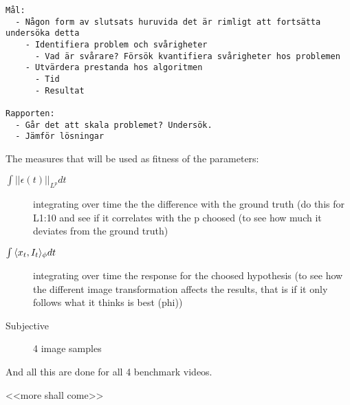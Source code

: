\begin{verbatim}
Mål:
  - Någon form av slutsats huruvida det är rimligt att fortsätta
undersöka detta
    - Identifiera problem och svårigheter
      - Vad är svårare? Försök kvantifiera svårigheter hos problemen
    - Utvärdera prestanda hos algoritmen
      - Tid
      - Resultat

Rapporten:
  - Går det att skala problemet? Undersök.
  - Jämför lösningar
\end{verbatim}

The measures that will be used as fitness of the parameters:
    \begin{description}
        \item[$\int{||\epsilon(t)||_{L^p}}dt$]
            integrating over time the the difference
            with the ground truth (do this for L{1:10} and see if it correlates with
            the p choosed (to see how much it deviates from the ground truth)
        \item[$\int{\langle x_t, I_t\rangle_{\phi} }dt$] 
            integrating over time the response
            for the choosed hypothesis (to see how the different image transformation
            affects the results, that is if it only follows what it thinks is best
            (phi))
        \item[Subjective] 4 image samples
    \end{description}
And all this are done for all 4 benchmark videos.

<<more shall come>>


